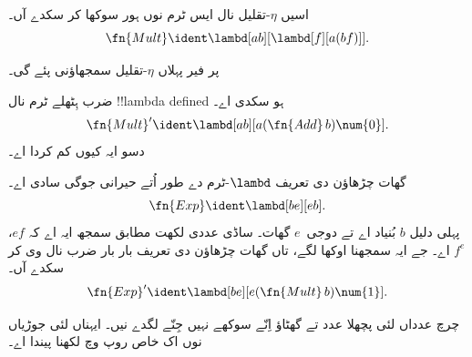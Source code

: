 \documentclass[../../../include/open-logic-section]{subfiles}
\begin{document}
\begin{editorial}
اسیں $\eta$-تقلیل نال ایس ٹرم نوں ہور سوکھا کر سکدے آں۔
\[
  \fn{Mult} \ident \lambd[ab][\lambd[f][a (b f)]].
\]

پر فیر پہلاں $\eta$-تقلیل سمجھاؤنی پئے گی۔
\end{editorial}

\begin{prob}
ضرب ہِٹھلے ٹرم نال !!{lambda defined} ہو سکدی اے۔
\[
  \fn{Mult}' \ident \lambd[ab][a (\fn{Add}\, b) \num{0}].
\]
دسو ایہ کیوں کم کردا اے۔
\end{prob}

گھات چڑھاؤن دی تعریف $\lambd$-ٹرم دے طور اُتے حیرانی جوگی
سادی اے۔
\[
  \fn{Exp} \ident \lambd[be][e b].
\]
پہلی دلیل $b$ بُنیاد اے تے دوجی~$e$ گھات۔ ساڈی عددی لکھت
مطابق سمجھ ایہ اے کہ $e f$، $f^e$ اے۔ جے ایہ سمجھنا اوکھا
لگے، تاں گھات چڑھاؤن دی تعریف بار بار ضرب نال وی کر سکدے آں۔
\[
  \fn{Exp}' \ident \lambd[be][e (\fn{Mult}\, b) \num{1}].
\]

چرچ عدداں لئی پچھلا عدد تے گھٹاؤ اِنّے سوکھے نہیں جِنّے
لگدے نیں۔ ایہناں لئی جوڑیاں نوں اک خاص روپ وچ لکھنا پیندا اے۔
\end{document}
